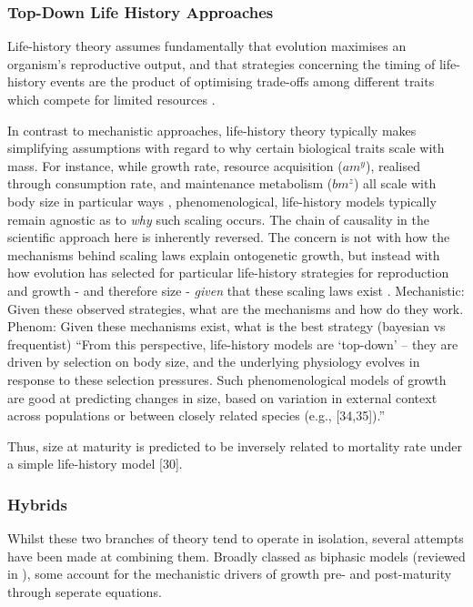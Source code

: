 \documentclass[a4paper]{article} %
\begin{document}
        
        \subsubsection{Top-Down Life History Approaches}
        Life-history theory assumes fundamentally that evolution maximises an organism's reproductive output, and that strategies concerning the timing of life-history events are the product of optimising trade-offs among different traits which compete for limited resources \autocite{Day1997, Stearns1989, stearns1992evolution}.      

        In contrast to mechanistic approaches, life-history theory typically makes simplifying assumptions with regard to why certain biological traits scale with mass. \autocite{Day1997, Kozowski1987-indeterminate} For instance, while growth rate, resource acquisition ($am^y$), realised through consumption rate, and maintenance metabolism ($bm^z$) all scale with body size in particular ways \autocite{peters1983,Werner1988,brown2000-scaling-book}, phenomenological, life-history models typically remain agnostic as to \textit{why} such scaling occurs. The chain of causality in the scientific approach here is inherently reversed. The concern is not with how the mechanisms behind scaling laws explain ontogenetic growth, but instead with how evolution has selected for particular life-history strategies for reproduction and growth - and therefore size - \textit{given} that these scaling laws exist \autocite{Danko2017}. Mechanistic: Given these observed strategies, what are the mechanisms and how do they work. Phenom: Given these mechanisms exist, what is the best strategy (bayesian vs frequentist) ``From this perspective, life-history models are ‘top-down’ – they are driven by selection on body size, and the underlying physiology evolves in response to these selection pressures. Such phenomenological models of growth are good at predicting changes in size, based on variation in external context across populations or between closely related species (e.g., [34,35]).''
        
        Thus, size at maturity is predicted to be inversely related to mortality rate under a simple life-history model [30].

        \subsubsection{Hybrids}
        Whilst these two branches of theory tend to operate in isolation, several attempts have been made at combining them. Broadly classed as biphasic models (reviewed in \autocite{Wilson2018}), some account for the mechanistic drivers of growth pre- and post-maturity through seperate equations. 
        
\end{document}
